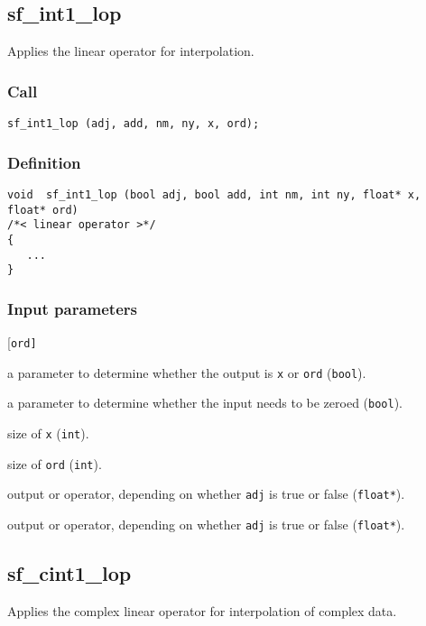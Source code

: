 \subsection{{sf\_int1\_lop}}
Applies the linear operator for interpolation.

\subsubsection*{Call}
\begin{verbatim}sf_int1_lop (adj, add, nm, ny, x, ord);\end{verbatim}

\subsubsection*{Definition}
\begin{verbatim}
void  sf_int1_lop (bool adj, bool add, int nm, int ny, float* x, float* ord)
/*< linear operator >*/
{ 
   ...
}
\end{verbatim}

\subsubsection*{Input parameters}
\begin{desclist}{\tt }{\quad}[\tt ord]
   \setlength\itemsep{0pt}
   \item[adj] a parameter to determine whether the output is \texttt{x} or \texttt{ord} (\texttt{bool}).
   \item[add] a parameter to determine whether the input needs to be zeroed (\texttt{bool}).
   \item[nm]  size of \texttt{x} (\texttt{int}).
   \item[ny]  size of \texttt{ord} (\texttt{int}).
   \item[x]   output or operator, depending on whether \texttt{adj} is true or false (\texttt{float*}).
   \item[ord] output or operator, depending on whether \texttt{adj} is true or false (\texttt{float*}).
\end{desclist}




\subsection{{sf\_cint1\_lop}}
Applies the complex linear operator for interpolation of complex data.


